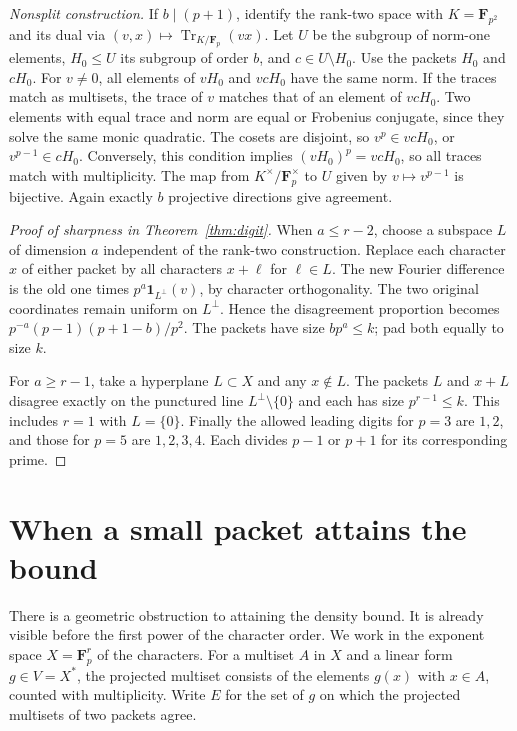 \documentclass[11pt,letterpaper]{article}
\newcommand{\Fp}{\mathbf F_p}
\theoremstyle{remark}
\begin{document}
\emph{Nonsplit construction.} If $b\mid(p+1)$, identify the rank-two space with $K=\mathbf F_{p^2}$ and its dual via $(v,x)\mapsto\operatorname{Tr}_{K/\Fp}(vx)$. Let $U$ be the subgroup of norm-one elements, $H_0\le U$ its subgroup of order $b$, and $c\in U\setminus H_0$. Use the packets $H_0$ and $cH_0$. For $v\ne0$, all elements of $vH_0$ and $vcH_0$ have the same norm. If the traces match as multisets, the trace of $v$ matches that of an element of $vcH_0$. Two elements with equal trace and norm are equal or Frobenius conjugate, since they solve the same monic quadratic. The cosets are disjoint, so $v^p\in vcH_0$, or $v^{p-1}\in cH_0$. Conversely, this condition implies $(vH_0)^p=vcH_0$, so all traces match with multiplicity. The map from $K^\times/\Fp^\times$ to $U$ given by $v\mapsto v^{p-1}$ is bijective. Again exactly $b$ projective directions give agreement.

\begin{proof}[Proof of sharpness in Theorem~\ref{thm:digit}]
When $a\le r-2$, choose a subspace $L$ of dimension $a$ independent of the rank-two construction. Replace each character $x$ of either packet by all characters $x+\ell$ for $\ell\in L$. The new Fourier difference is the old one times $p^a\mathbf 1_{L^\perp}(v)$, by character orthogonality. The two original coordinates remain uniform on $L^\perp$. Hence the disagreement proportion becomes $p^{-a}(p-1)(p+1-b)/p^2$. The packets have size $bp^a\le k$; pad both equally to size $k$.

For $a\ge r-1$, take a hyperplane $L\subset X$ and any $x\notin L$. The packets $L$ and $x+L$ disagree exactly on the punctured line $L^\perp\setminus\{0\}$ and each has size $p^{r-1}\le k$. This includes $r=1$ with $L=\{0\}$. Finally the allowed leading digits for $p=3$ are $1,2$, and those for $p=5$ are $1,2,3,4$. Each divides $p-1$ or $p+1$ for its corresponding prime.
\end{proof}
\section{When a small packet attains the bound}
\label{sec:geometry}

There is a geometric obstruction to attaining the density bound.  It is
already visible before the first power of the character order.  We work in
the exponent space $X=\Fp^r$ of the characters.  For a multiset $A$ in $X$
and a linear form $g\in V=X^*$, the projected multiset consists of the
elements $g(x)$ with $x\in A$, counted with multiplicity.  Write $E$ for
the set of $g$ on which the projected multisets of two packets agree.
\end{document}
